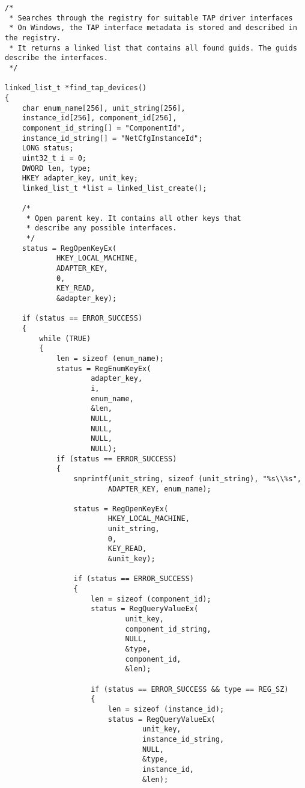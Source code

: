 \begin{lstlisting}[caption=Code für das Suchen eines TAP-Geräts,label=lst:find_tap_devices]
/*
 * Searches through the registry for suitable TAP driver interfaces
 * On Windows, the TAP interface metadata is stored and described in the registry.
 * It returns a linked list that contains all found guids. The guids describe the interfaces.
 */

linked_list_t *find_tap_devices()
{
    char enum_name[256], unit_string[256],
    instance_id[256], component_id[256],
    component_id_string[] = "ComponentId",
    instance_id_string[] = "NetCfgInstanceId";
    LONG status;
    uint32_t i = 0;
    DWORD len, type;
    HKEY adapter_key, unit_key;
    linked_list_t *list = linked_list_create();

    /*
     * Open parent key. It contains all other keys that
     * describe any possible interfaces.
     */
    status = RegOpenKeyEx(
            HKEY_LOCAL_MACHINE,
            ADAPTER_KEY,
            0,
            KEY_READ,
            &adapter_key);

    if (status == ERROR_SUCCESS)
    {
        while (TRUE)
        {
            len = sizeof (enum_name);
            status = RegEnumKeyEx(
                    adapter_key,
                    i,
                    enum_name,
                    &len,
                    NULL,
                    NULL,
                    NULL,
                    NULL);
            if (status == ERROR_SUCCESS)
            {
                snprintf(unit_string, sizeof (unit_string), "%s\\%s",
                        ADAPTER_KEY, enum_name);

                status = RegOpenKeyEx(
                        HKEY_LOCAL_MACHINE,
                        unit_string,
                        0,
                        KEY_READ,
                        &unit_key);

                if (status == ERROR_SUCCESS)
                {
                    len = sizeof (component_id);
                    status = RegQueryValueEx(
                            unit_key,
                            component_id_string,
                            NULL,
                            &type,
                            component_id,
                            &len);

                    if (status == ERROR_SUCCESS && type == REG_SZ)
                    {
                        len = sizeof (instance_id);
                        status = RegQueryValueEx(
                                unit_key,
                                instance_id_string,
                                NULL,
                                &type,
                                instance_id,
                                &len);


\end{lstlisting}
